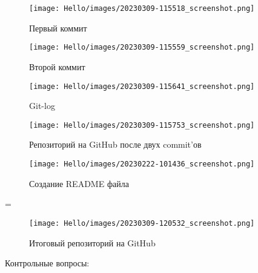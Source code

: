 \documentclass[a4paper,14pt]{extarticle}
\begin{document}
\begin{figure}[htbp]
\centering
\texttt{[image: Hello/images/20230309-115518\_screenshot.png]}
\caption{Первый коммит}
\end{figure}


\begin{figure}[htbp]
\centering
\texttt{[image: Hello/images/20230309-115559\_screenshot.png]}
\caption{Второй коммит}
\end{figure}

\begin{figure}[htbp]
\centering
\texttt{[image: Hello/images/20230309-115641\_screenshot.png]}
\caption{Git-log}
\end{figure}


\begin{figure}[htbp]
\centering
\texttt{[image: Hello/images/20230309-115753\_screenshot.png]}
\caption{Репозиторий на GitHub после двух commit'ов}
\end{figure}


\begin{figure}[htbp]
\centering
\texttt{[image: Hello/images/20230222-101436\_screenshot.png]}
\caption{Создание README файла}
\end{figure}

=\begin{figure}[htbp]
\centering
\texttt{[image: Hello/images/20230309-120532\_screenshot.png]}
\caption{Итоговый репозиторий на GitHub}
\end{figure}


\clearpage

Контрольные вопросы:
\end{document}
